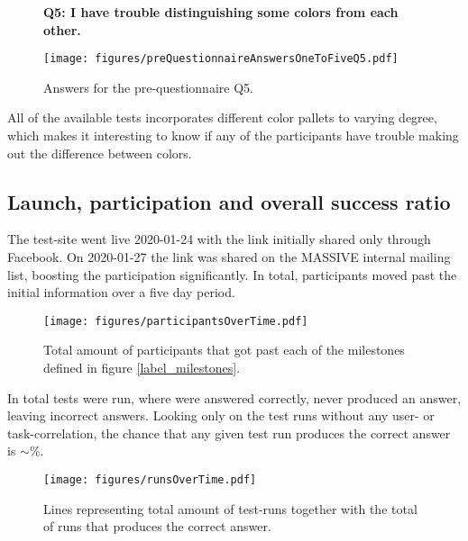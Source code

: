     \begin{figure}[h!]
      \textbf{Q5: I have trouble distinguishing some colors from each other.}
      \begin{center}
        \texttt{[image: figures/preQuestionnaireAnswersOneToFiveQ5.pdf]}
        \vspace{-1cm}
        \caption{Answers for the pre-questionnaire Q5.}
        \vspace{-0.4cm}
      \end{center}
    \end{figure}

    All of the available tests incorporates different color pallets to
    varying degree, which makes it interesting to know if any of the
    participants have trouble making out the difference between colors.
    \vspace{-0.6cm}

  \newpage
  \subsection{Launch, participation and overall success ratio}

    The test-site went live 2020-01-24 with the link initially shared only
    through Facebook. On 2020-01-27 the link was shared on the MASSIVE
    internal mailing list, boosting the participation significantly.
    In total,  participants moved past the
    initial information over a five day period.

    \begin{figure}[h!]
      \centering
      \texttt{[image: figures/participantsOverTime.pdf]}
      \vspace{-0.3cm}
      \caption{
        Total amount of participants that got past each of the milestones
        defined in figure \ref{label_milestones}.
      }
    \end{figure}

    In total  tests were run, where
     were answered correctly,
     never produced an answer, leaving
     incorrect answers. Looking only on the test
    runs without any user- or task-correlation, the chance that any given test run
    produces the correct answer is $\sim$\%.

    \begin{figure}[h!]
      \centering
      \texttt{[image: figures/runsOverTime.pdf]}
      \vspace{-0.3cm}
      \caption{Lines representing total amount of test-runs together with
        the total of runs that produces the correct answer.}
      \vspace{-0.4cm}
    \end{figure}

